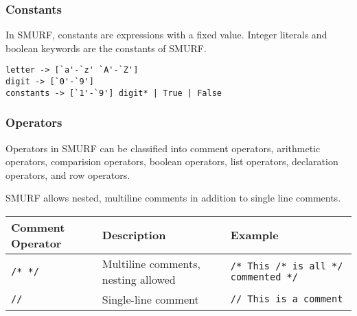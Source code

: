 \subsubsection{Constants}
\label{sec:constants}
In SMURF, constants are expressions with a fixed value. Integer literals and
boolean keywords are the constants of SMURF. 

\begin{verbatim}
letter -> [`a'-`z' `A'-`Z']
digit -> [`0'-`9']
constants -> [`1'-`9'] digit* | True | False
\end{verbatim}


\subsubsection{Operators}
Operators in SMURF can be classified into comment operators, arithmetic operators, comparision
operators, boolean operators, list operators, declaration operators, and row operators. 

SMURF allows nested, multiline comments in addition to single line comments.
\begin{table} [H]
\centering
\begin{tabularx}{\textwidth}{lXl}
\hline\hline
Comment Operator & Description & Example \\
\hline\hline
  \texttt{/* */} & Multiline comments, nesting allowed & \texttt{/* This /* is all */ commented */} \\ \hline
  \texttt{//} & Single-line comment & \texttt{// This is a comment} \\ \hline
\end{tabularx}
\end{table}

